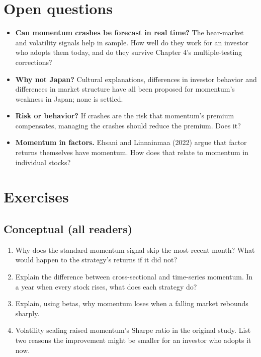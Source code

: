 \section{Open questions}
\label{sec:09-open}

\begin{itemize}
  \item \textbf{Can momentum crashes be forecast in real time?} The bear-market and volatility signals help in sample. How well do they work for an investor who adopts them today, and do they survive Chapter 4's multiple-testing corrections?
  \item \textbf{Why not Japan?} Cultural explanations, differences in investor behavior and differences in market structure have all been proposed for momentum's weakness in Japan; none is settled.
  \item \textbf{Risk or behavior?} If crashes are the risk that momentum's premium compensates, managing the crashes should reduce the premium. Does it?
  \item \textbf{Momentum in factors.} Ehsani and Linnainmaa (2022) argue that factor returns themselves have momentum. How does that relate to momentum in individual stocks?
\end{itemize}

\section*{Exercises}

\subsection*{Conceptual (all readers)}

\begin{enumerate}
  \item Why does the standard momentum signal skip the most recent month? What would happen to the strategy's returns if it did not?
  \item Explain the difference between cross-sectional and time-series momentum. In a year when every stock rises, what does each strategy do?
  \item Explain, using betas, why momentum loses when a falling market rebounds sharply.
  \item Volatility scaling raised momentum's Sharpe ratio in the original study. List two reasons the improvement might be smaller for an investor who adopts it now.
\end{enumerate}

